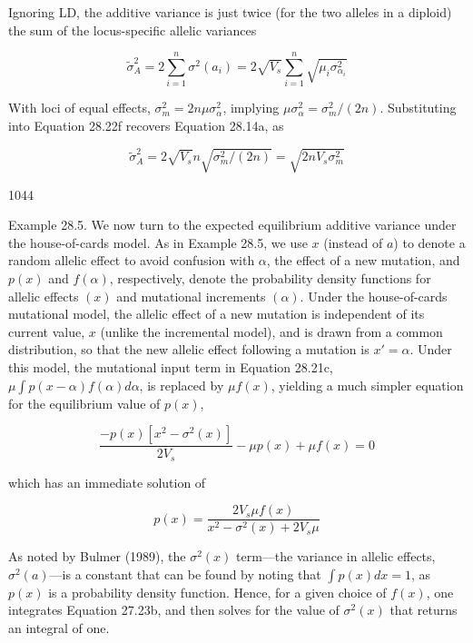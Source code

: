 \documentclass{article}
\begin{document}
Ignoring LD, the additive variance is just twice (for the two alleles in a diploid) the sum of the locus-specific allelic variances

\begin{equation}
\widetilde{\sigma}_{A}^{2}=2\sum_{i=1}^{n}\sigma^{2}(a_{i})=2\sqrt{V_{s}}\sum_{i=1}^{n}\sqrt{\mu_{i}\sigma_{\alpha_{i}}^{2}}
\tag{28.22f}
\label{eq:28_22f}
\end{equation}

With loci of equal effects,  $ \sigma_m^2 = 2n\mu\sigma_\alpha^2 $, implying  $ \mu\sigma_\alpha^2 = \sigma_m^2/(2n) $. Substituting into Equation 28.22f recovers Equation 28.14a, as

\begin{equation}
\widetilde{\sigma}_{A}^{2}=2\sqrt{V_{s}}n\sqrt{\sigma_{m}^{2}/(2n)}=\sqrt{2nV_{s}\sigma_{m}^{2}}
\tag{28.22g}
\label{eq:28_22g}
\end{equation}

1044

Example 28.5. We now turn to the expected equilibrium additive variance under the house-of-cards model. As in Example 28.5, we use $x$ (instead of $a$) to denote a random allelic effect to avoid confusion with $\alpha$, the effect of a new mutation, and $p(x)$ and $f(\alpha)$, respectively, denote the probability density functions for allelic effects $(x)$ and mutational increments $(\alpha)$. Under the house-of-cards mutational model, the allelic effect of a new mutation is independent of its current value, $x$ (unlike the incremental model), and is drawn from a common distribution, so that the new allelic effect following a mutation is $x' = \alpha$. Under this model, the mutational input term in Equation 28.21c, $\mu \int p(x - \alpha) f(\alpha) d\alpha$, is replaced by $\mu f(x)$, yielding a much simpler equation for the equilibrium value of $p(x)$,

\begin{equation}
\frac{-p(x)[x^{2}-\sigma^{2}(x)]}{2V_{s}}-\mu p(x)+\mu f(x)=0
\tag{28.23a}
\label{eq:28_23a}
\end{equation}

which has an immediate solution of

\begin{equation}
p(x)=\frac{2V_{s}\mu f(x)}{x^{2}-\sigma^{2}(x)+2V_{s}\mu}
\tag{28.23b}
\label{eq:28_23b}
\end{equation}

As noted by Bulmer (1989), the  $ \sigma^{2}(x) $ term—the variance in allelic effects,  $ \sigma^{2}(a) $—is a constant that can be found by noting that  $ \int p(x)dx = 1 $, as  $ p(x) $ is a probability density function. Hence, for a given choice of  $ f(x) $, one integrates Equation 27.23b, and then solves for the value of  $ \sigma^{2}(x) $ that returns an integral of one.
\end{document}
